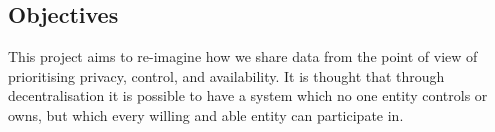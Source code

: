 \subsection{Objectives}

This project aims to re-imagine how we share data from the point of view of prioritising privacy, control, and availability. It is thought that through decentralisation it is possible to have a system which no one entity controls or owns, but which every willing and able entity can participate in.
